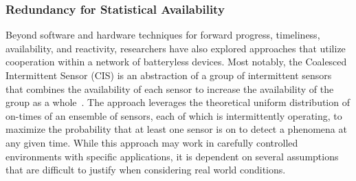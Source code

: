 



\subsubsection{Redundancy for Statistical Availability}
Beyond software and hardware techniques for forward progress, timeliness, availability, and reactivity, researchers have also explored approaches that utilize cooperation within a network of batteryless devices.
Most notably, the Coalesced Intermittent Sensor (CIS) is an abstraction of a group of intermittent sensors that combines the availability of each sensor to increase the availability of the group as a whole~\cite{majid2020continuous}.
The approach leverages the theoretical uniform distribution of on-times of an ensemble of sensors, each of which is intermittently operating, to maximize the probability that at least one sensor is on to detect a phenomena at any given time.
While this approach may work in carefully controlled environments with specific applications, it is dependent on several assumptions that are difficult to justify when considering real world conditions.

